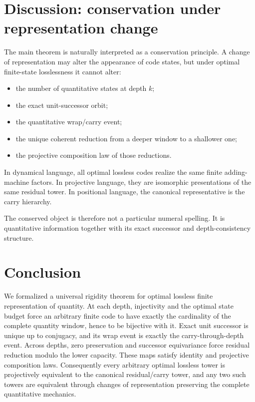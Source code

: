 \documentclass[11pt]{article}
\theoremstyle{definition}
\begin{document}
\section{Discussion: conservation under representation change}

The main theorem is naturally interpreted as a conservation principle. A change of representation may alter the appearance of code states, but under optimal finite-state losslessness it cannot alter:
\begin{itemize}
\item the number of quantitative states at depth $k$;
\item the exact unit-successor orbit;
\item the quantitative wrap/carry event;
\item the unique coherent reduction from a deeper window to a shallower one;
\item the projective composition law of those reductions.
\end{itemize}

In dynamical language, all optimal lossless codes realize the same finite adding-machine factors. In projective language, they are isomorphic presentations of the same residual tower. In positional language, the canonical representative is the carry hierarchy.

The conserved object is therefore not a particular numeral spelling. It is quantitative information together with its exact successor and depth-consistency structure.

\section{Conclusion}

We formalized a universal rigidity theorem for optimal lossless finite representation of quantity. At each depth, injectivity and the optimal state budget force an arbitrary finite code to have exactly the cardinality of the complete quantity window, hence to be bijective with it. Exact unit successor is unique up to conjugacy, and its wrap event is exactly the carry-through-depth event. Across depths, zero preservation and successor equivariance force residual reduction modulo the lower capacity. These maps satisfy identity and projective composition laws. Consequently every arbitrary optimal lossless tower is projectively equivalent to the canonical residual/carry tower, and any two such towers are equivalent through changes of representation preserving the complete quantitative mechanics.
\end{document}
